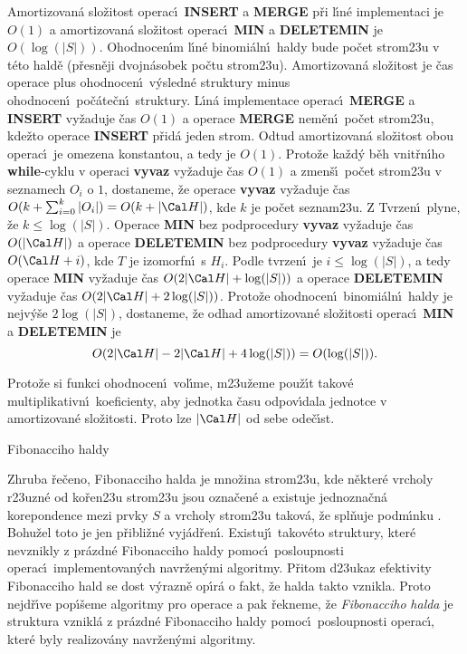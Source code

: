 \flushpar Amortizovan\'a slo\v zitost operac\'\i\ 
{\bf INSERT} a {\bf MER\-GE} p\v ri l\'\i n\'e implementaci je $O
(1)$ a 
amortizovan\'a slo\v zitost operac\'\i\ {\bf MIN} a {\bf DELETEMIN  }
je $O(\log(|S|))$. Ohodnocen\'\i m l\'\i n\'e 
binomi\'aln\'\i\ haldy bude po\v cet strom\accent23u v t\'eto 
hald\v e (p\v resn\v eji dvojn\'asobek po\v ctu strom\accent23u). 
Amortizovan\'a slo\v zitost je \v cas operace plus 
ohodnocen\'\i\ v\'ysledn\'e struktury minus ohodnocen\'\i\ 
po\v c\'ate\v cn\'\i\ struktury. L\'\i n\'a implementace operac\'\i\ {\bf MER\-GE} a {\bf INSERT  }
vy\v zaduje \v cas $O(1)$ a operace {\bf MERGE} nem\v e\-n\'\i\ 
po\v cet strom\accent23u, kde\v zto operace {\bf INSERT} p\v rid\'a jeden 
strom. Odtud amortizovan\'a slo\v zitost obou operac\'\i\ je 
omezena kons\-tantou, a tedy je $O(1)$. Proto\v ze ka\v zd\'y b\v eh 
vnit\v rn\'\i ho {\bf while}-cyklu v operaci {\bf vyvaz} vy\v zaduje \v cas $
O(1)$ 
a zmen\v s\'\i\ po\v cet stro\-m\accent23u v seznamech $O_i$ o $1$, 
dostaneme, \v ze ope\-ra\-ce {\bf vyvaz} vy\v zaduje \v cas $O(k+\sum_{i=0}^k|O_i|
)=O(k+|\Cal H|)$, kde $k$ je po\v cet 
seznam\accent23u. Z Tvrzen\'\i\ plyne, \v ze $k\le\log(|S|)$. Ope\-ra\-ce {\bf MIN}
bez podprocedury {\bf vyvaz} vy\v zaduje \v cas $O(|\Cal H|)$ a operace 
{\bf DE\-LE\-TEMIN} bez podprocedury {\bf vyvaz} vy\v zaduje \v cas $
O(\Cal H+i)$, 
kde $T$ je izomorfn\'\i\ s $H_i$. Podle tvrzen\'\i\ je $i\le\log(
|S|)$, a 
tedy ope\-ra\-ce {\bf MIN} vy\v zaduje \v cas $O(2|\Cal H|+\log(|S|))$ a ope\-race 
{\bf DE\-LE\-TEMIN} vy\-\v zaduje \v cas $O(2|\Cal H|+2\log(|S|))$. Proto\v ze  
ohodnocen\'\i\ binomi\'aln\'\i\ haldy je nejv\'y\v se $2\log(|S|)$, 
dostaneme, \v ze odhad  
amortizovan\'e slo\v zitosti operac\'\i\ {\bf MIN} a {\bf DELETEMIN} je
$$O(2|\Cal H|-2|\Cal H|+4\log(|S|))=O(\log(|S|)).$$
\medskip

\flushpar Proto\v ze si funkci ohodnocen\'\i\ vol\'\i me, 
m\accent23u\v zeme pou\v z\'\i t takov\'e multiplikativn\'\i\ 
koeficienty, aby jednotka \v casu odpov\'\i dala jednotce v 
amortizovan\'e slo\v zitosti. Proto lze $|\Cal H|$ od sebe ode\v c\'\i st.

\heading
Fibonacciho haldy
\endheading

\flushpar Zhruba \v re\v ceno, Fibonacciho halda je mno\v zina 
strom\accent23u, kde n\v ekter\'e vrcholy r\accent23uzn\'e od 
ko\v ren\accent23u strom\accent23u jsou ozna\v cen\'e a existuje 
jednozna\v cn\'a korepondence mezi prvky $S$ a vrcholy 
strom\accent23u takov\'a, \v ze spl\v nuje podm\'\i nku 
\thetag{usp}. Bohu\v zel toto je jen p\v ribli\v z\-n\'e vyj\'ad\v ren\'\i . 
Existuj\'\i\ takov\'eto struktury, kter\'e nevznikly z pr\'azd\-n\'e 
Fibonacciho haldy pomoc\'\i\ posloupnosti ope\-rac\'\i\ 
implementovan\'ych navr\v zen\'ymi algoritmy. P\v ritom 
d\accent23ukaz efekti\-vity Fibonacciho hald se dost 
v\'yrazn\v e op\'\i r\'a o fakt, \v ze halda takto vznikla. Proto 
nejd\v r\'\i ve pop\'\i\v seme algoritmy pro operace a pak \v rekneme, 
\v ze \emph{Fibonacciho} \emph{halda} je struktura vznikl\'a 
z pr\'azdn\'e Fibonacciho haldy pomoc\'\i\ posloupnosti operac\'\i , 
kter\'e byly realizov\'any navr\v zen\'ymi algoritmy.
\medskip

